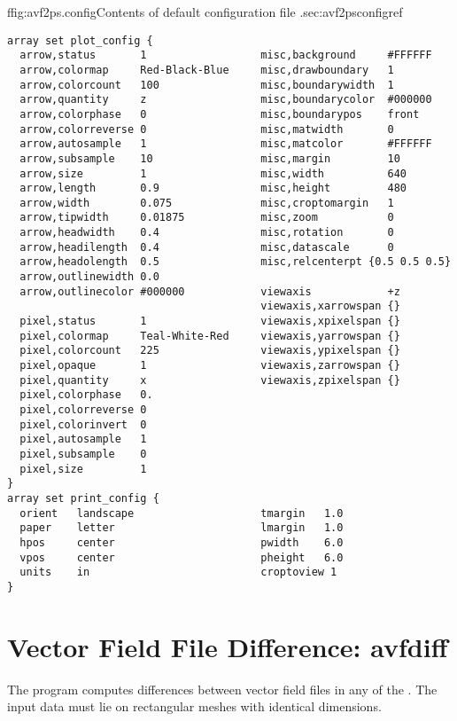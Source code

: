 \begin{codelisting}{f}{fig:avf2ps.config}{Contents of default configuration
  file .}{sec:avf2psconfig}{ref}
\begin{verbatim}
array set plot_config {
  arrow,status       1                  misc,background     #FFFFFF
  arrow,colormap     Red-Black-Blue     misc,drawboundary   1
  arrow,colorcount   100                misc,boundarywidth  1
  arrow,quantity     z                  misc,boundarycolor  #000000
  arrow,colorphase   0                  misc,boundarypos    front
  arrow,colorreverse 0                  misc,matwidth       0
  arrow,autosample   1                  misc,matcolor       #FFFFFF
  arrow,subsample    10                 misc,margin         10
  arrow,size         1                  misc,width          640
  arrow,length       0.9                misc,height         480
  arrow,width        0.075              misc,croptomargin   1
  arrow,tipwidth     0.01875            misc,zoom           0
  arrow,headwidth    0.4                misc,rotation       0
  arrow,headilength  0.4                misc,datascale      0
  arrow,headolength  0.5                misc,relcenterpt {0.5 0.5 0.5}
  arrow,outlinewidth 0.0
  arrow,outlinecolor #000000            viewaxis            +z
                                        viewaxis,xarrowspan {}
  pixel,status       1                  viewaxis,xpixelspan {}
  pixel,colormap     Teal-White-Red     viewaxis,yarrowspan {}
  pixel,colorcount   225                viewaxis,ypixelspan {}
  pixel,opaque       1                  viewaxis,zarrowspan {}
  pixel,quantity     x                  viewaxis,zpixelspan {}
  pixel,colorphase   0.
  pixel,colorreverse 0
  pixel,colorinvert  0
  pixel,autosample   1
  pixel,subsample    0
  pixel,size         1
}
array set print_config {
  orient   landscape                    tmargin   1.0
  paper    letter                       lmargin   1.0
  hpos     center                       pwidth    6.0
  vpos     center                       pheight   6.0
  units    in                           croptoview 1
}
\end{verbatim}
\end{codelisting}


\section{Vector Field File Difference:
          avfdiff}\label{sec:avfdiff}%
%
The  program computes differences between vector field files
in any of the
\HTMLoutput{ (\OVF, \VIO)}.  The input data
must lie on rectangular meshes with identical dimensions.


